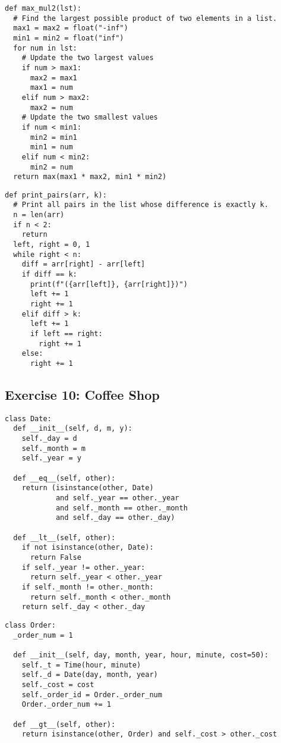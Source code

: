 \documentclass[11pt]{article}
\begin{document}
\begin{multicols}{2}
\begin{lstlisting}
def max_mul2(lst):
  # Find the largest possible product of two elements in a list.
  max1 = max2 = float("-inf")
  min1 = min2 = float("inf")
  for num in lst:
    # Update the two largest values
    if num > max1:
      max2 = max1
      max1 = num
    elif num > max2:
      max2 = num
    # Update the two smallest values
    if num < min1:
      min2 = min1
      min1 = num
    elif num < min2:
      min2 = num
  return max(max1 * max2, min1 * min2)
\end{lstlisting}
\begin{lstlisting}
def print_pairs(arr, k):
  # Print all pairs in the list whose difference is exactly k.
  n = len(arr)
  if n < 2:
    return
  left, right = 0, 1
  while right < n:
    diff = arr[right] - arr[left]
    if diff == k:
      print(f"({arr[left]}, {arr[right]})")
      left += 1
      right += 1
    elif diff > k:
      left += 1
      if left == right:
        right += 1
    else:
      right += 1
\end{lstlisting}
\end{multicols}

\subsection{Exercise 10: Coffee Shop}\label{subsec:exercise-10}
\begin{lstlisting}
class Date:
  def __init__(self, d, m, y):
    self._day = d
    self._month = m
    self._year = y

  def __eq__(self, other):
    return (isinstance(other, Date)
            and self._year == other._year
            and self._month == other._month
            and self._day == other._day)

  def __lt__(self, other):
    if not isinstance(other, Date):
      return False
    if self._year != other._year:
      return self._year < other._year
    if self._month != other._month:
      return self._month < other._month
    return self._day < other._day
\end{lstlisting}

\pagebreak

\begin{lstlisting}
class Order:
  _order_num = 1

  def __init__(self, day, month, year, hour, minute, cost=50):
    self._t = Time(hour, minute)
    self._d = Date(day, month, year)
    self._cost = cost
    self._order_id = Order._order_num
    Order._order_num += 1

  def __gt__(self, other):
    return isinstance(other, Order) and self._cost > other._cost
\end{lstlisting}
\end{document}
